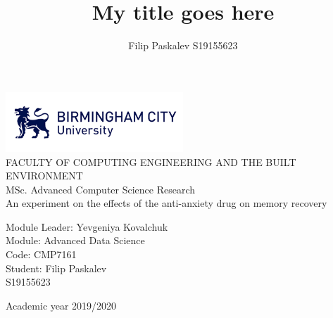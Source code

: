 \documentclass{article}
\title{My title goes here}
\author{Filip Paskalev S19155623}
\begin{document}


    \begin{titlepage}
        \begin{center}
            \vspace{0.5cm}
            \LARGE
            \includegraphics[width=0.5\textwidth]{images/bcu-logo-rectangle.png}\\
            FACULTY OF COMPUTING ENGINEERING AND THE BUILT ENVIRONMENT\\
            \vspace{0.5cm}
            \large
            MSc. Advanced Computer Science
            \vspace{1cm}
            \vspace{0.5cm}
            Research\\
            \Huge
            An experiment on the effects of the anti-anxiety drug on memory recovery
            \vspace{0.5cm}
        \end{center}
        \vspace*{\fill}
        \raggedcenter
        Module Leader: Yevgeniya Kovalchuk
        \vspace{0.2cm}\\
        Module: Advanced Data Science\\
        Code: CMP7161\\
        Student: Filip Paskalev \\
        \cyrchar\textnumero{} S19155623
        \vspace{0.125cm}\\
        \begin{center}
            \vspace{1cm}
            Academic year 2019/2020
        \end{center}
    \end{titlepage}

    \newpage

    \makeglossary
    \newpage

    \makeindex
    \tableofcontents
    \listoffigures
    \listoftables
    \newpage
\end{document}
